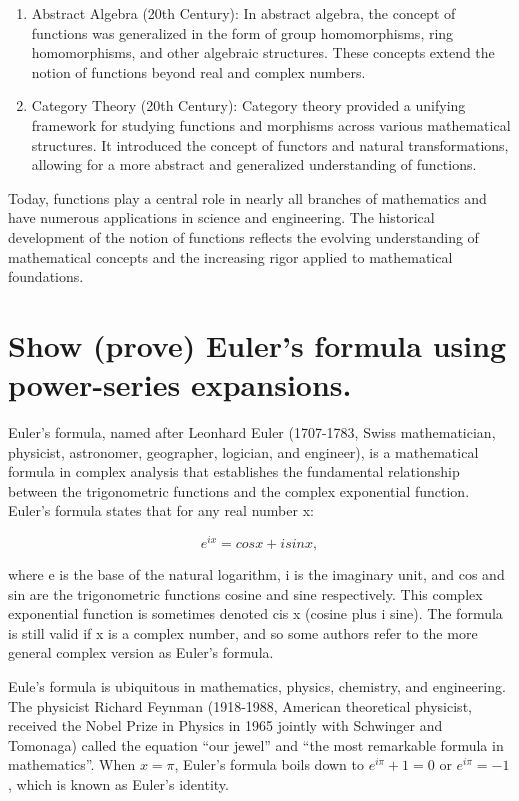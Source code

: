\documentclass{article}
\begin{document}
\begin{enumerate}
  \item Abstract Algebra (20th Century): In abstract algebra, the concept of functions was generalized in the form of group homomorphisms, ring homomorphisms, and other algebraic structures. These concepts extend the notion of functions beyond real and complex numbers.
  \item Category Theory (20th Century): Category theory provided a unifying framework for studying functions and morphisms across various mathematical structures. It introduced the concept of functors and natural transformations, allowing for a more abstract and generalized understanding of functions.
\end{enumerate}

Today, functions play a central role in nearly all branches of mathematics and have numerous applications in science and engineering. The historical development of the notion of functions reflects the evolving understanding of mathematical concepts and the increasing rigor applied to mathematical foundations.


\section{Show (prove) Euler's formula using power-series expansions.}

Euler's formula, named after Leonhard Euler (1707-1783, Swiss mathematician, physicist, astronomer, geographer, logician, and engineer), is a mathematical formula in complex analysis that establishes the fundamental relationship between the trigonometric functions and the complex exponential function. Euler's formula states that for any real number x:

\begin{equation*}
  e^{ix} = cos x + i sin x,
\end{equation*}

where e is the base of the natural logarithm, i is the imaginary unit, and cos and sin are the trigonometric functions cosine and sine respectively. This complex exponential function is sometimes denoted cis x (cosine plus i sine). The formula is still valid if x is a complex number, and so some authors refer to the more general complex version as Euler's formula.

Eule's formula is ubiquitous in mathematics, physics, chemistry, and engineering. The physicist Richard Feynman (1918-1988, American theoretical physicist, received the Nobel Prize in Physics in 1965 jointly with Schwinger and Tomonaga) called the equation “our jewel” and “the most remarkable formula in mathematics”. When $x = \pi$, Euler's formula boils down to $e^{i\pi} + 1 = 0$ or $e^{i\pi} = -1$, which is known as Euler's identity.
\end{document}
